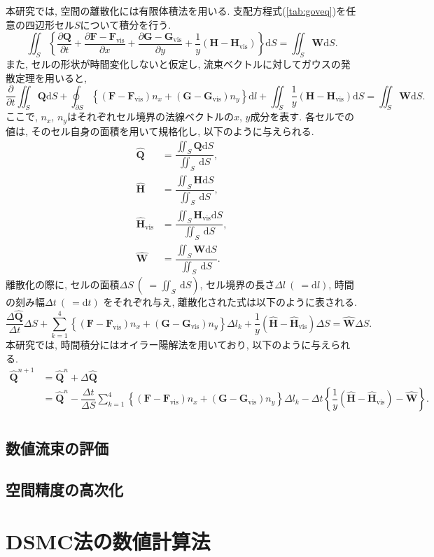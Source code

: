 本研究では,
空間の離散化には有限体積法を用いる.
支配方程式(\ref{tab:goveq})を任意の四辺形セル$S$について積分を行う.
\begin{equation}
\iint_{S} \left\{ \dfrac{\partial \bm{Q}}{\partial t}+\dfrac{\partial \bm{F}-\bm{F}_\mathrm{vis}}{\partial x}+\dfrac{\partial \bm{G}-\bm{G}_\mathrm{vis}}{\partial y}+\dfrac{1}{y}(\bm{H}-\bm{H}_\mathrm{vis}) \right\} \mathrm{d}S = \iint _{S}\bm{W}\mathrm{d}S. 
\end{equation}
また,
セルの形状が時間変化しないと仮定し,
流束ベクトルに対してガウスの発散定理を用いると,
\begin{equation}
\dfrac{\partial}{\partial t} \iint _{S}\bm{Q}\mathrm{d}S+\oint_{\partial S} \left\{ (\bm{F}-\bm{F}_\mathrm{vis})n_{x}+(\bm{G}-\bm{G}_\mathrm{vis})n_{y}\right\}\mathrm{d}l+\iint_{S}\dfrac{1}{y}(\bm{H}-\bm{H}_\mathrm{vis})\mathrm{d}S = \iint _{S}\bm{W}\mathrm{d}S. 
\end{equation}
ここで,
$n_{x}$, $n_{y}$はそれぞれセル境界の法線ベクトルの$x$, $y$成分を表す.
各セルでの値は,
そのセル自身の面積を用いて規格化し,
以下のように与えられる.
\begin{align}
  \hat{\bm{Q}}&=\dfrac{\iint_S\bm{Q}\mathrm{d}S}{\iint_S~\mathrm{d}S},\\
  \hat{\bm{H}}&=\dfrac{\iint_S\bm{H}\mathrm{d}S}{\iint_S~\mathrm{d}S},\\
  \hat{\bm{H}}_\mathrm{vis}&=\dfrac{\iint_S\bm{H}_\mathrm{vis}\mathrm{d}S}{\iint_S~\mathrm{d}S},\\
  \hat{\bm{W}}&=\dfrac{\iint_S\bm{W}\mathrm{d}S}{\iint_S~\mathrm{d}S}.
\end{align}
離散化の際に,
セルの面積$\Delta S\ (\ =\iint_S~\mathrm{d}S)$,
セル境界の長さ$\Delta l\ (\ =\mathrm{d}l)$,
時間の刻み幅$\Delta t\ (\ =\mathrm{d}t)$
をそれぞれ与え,
離散化された式は以下のように表される.
\begin{equation}
\dfrac{\Delta \hat{\bm{Q}}}{\Delta t}\Delta S+\sum^{4}_{k=1} \left\{ (\bm{F}-\bm{F}_\mathrm{vis})n_{x}+(\bm{G}-\bm{G}_\mathrm{vis})n_{y}\right\} \Delta l_{k}+\dfrac{1}{y}(\hat{\bm{H}}-\hat {\bm{H}}_\mathrm{vis})\Delta S = \hat{\bm{W}}\Delta S. 
\end{equation}
本研究では,
時間積分にはオイラー陽解法を用いており,
以下のように与えられる.
\begin{align}
\hat{\bm{Q}}^{n+1}&=\hat{\bm{Q}}^{n}+\Delta\hat{\bm{Q}} \nonumber\\
                  &=\hat{\bm{Q}}^{n}-\dfrac{\Delta t}{\Delta S}\sum^{4}_{k=1} \left\{ (\bm{F}-\bm{F}_\mathrm{vis})n_{x}+(\bm{G}-\bm{G}_\mathrm{vis})n_{y}\right\} \Delta l_{k}-{\Delta t} \left\{ \dfrac{1}{y}(\hat{\bm{H}}-\hat{\bm{H}}_\mathrm{vis})-\hat{\bm{W}} \right\}\nonumber.\\ 
\end{align}

\subsection{数値流束の評価}



\subsection{空間精度の高次化}


\newpage
\section{DSMC法の数値計算法}


